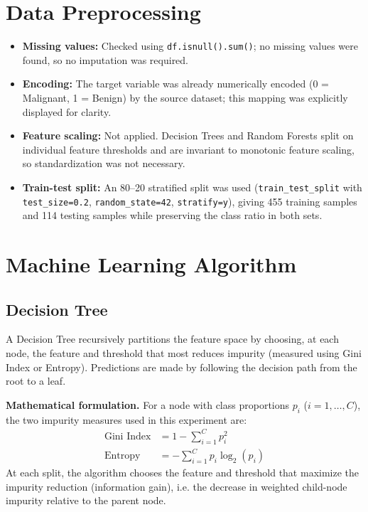 \documentclass[12pt,a4paper]{article}
\begin{document}
\section{Data Preprocessing}
\begin{itemize}[nosep]
\item \textbf{Missing values:} Checked using \texttt{df.isnull().sum()}; no missing values were found, so no imputation was required.
\item \textbf{Encoding:} The target variable was already numerically encoded (0 = Malignant, 1 = Benign) by the source dataset; this mapping was explicitly displayed for clarity.
\item \textbf{Feature scaling:} Not applied. Decision Trees and Random Forests split on individual feature thresholds and are invariant to monotonic feature scaling, so standardization was not necessary.
\item \textbf{Train-test split:} An 80--20 stratified split was used (\texttt{train\_test\_split} with \texttt{test\_size=0.2}, \texttt{random\_state=42}, \texttt{stratify=y}), giving 455 training samples and 114 testing samples while preserving the class ratio in both sets.
\end{itemize}

\section{Machine Learning Algorithm}

\subsection{Decision Tree}
A Decision Tree recursively partitions the feature space by choosing, at each node, the feature and threshold that most reduces impurity (measured using Gini Index or Entropy). Predictions are made by following the decision path from the root to a leaf.

\textbf{Mathematical formulation.} For a node with class proportions $p_i$ ($i = 1, \dots, C$), the two impurity measures used in this experiment are:
\begin{align}
\text{Gini Index} &= 1 - \sum_{i=1}^{C} p_i^2 \\
\text{Entropy} &= -\sum_{i=1}^{C} p_i \log_2(p_i)
\end{align}
At each split, the algorithm chooses the feature and threshold that maximize the impurity reduction (information gain), i.e. the decrease in weighted child-node impurity relative to the parent node.
\end{document}
